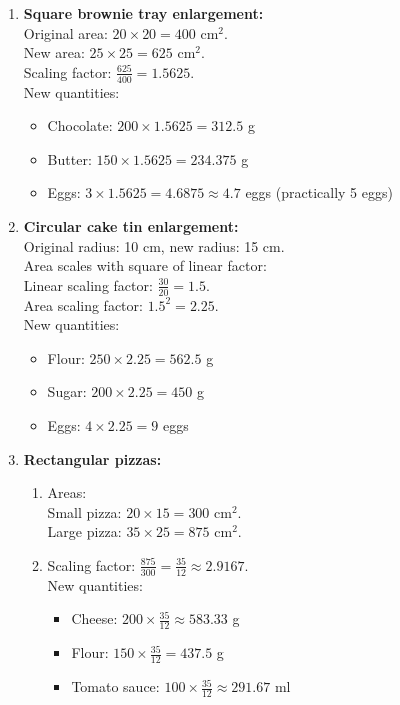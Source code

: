 \documentclass[12pt]{article}
\begin{document}
\begin{enumerate}[resume]
    \item \textbf{Square brownie tray enlargement:} \\
    Original area: \( 20 \times 20 = 400\) cm\(^2\). \\
    New area: \( 25 \times 25 = 625\) cm\(^2\). \\
    Scaling factor: \( \frac{625}{400} = 1.5625 \). \\
    New quantities:
    \begin{itemize}
        \item Chocolate: \( 200 \times 1.5625 = 312.5\) g
        \item Butter: \( 150 \times 1.5625 = 234.375\) g
        \item Eggs: \( 3 \times 1.5625 = 4.6875 \approx 4.7\) eggs (practically 5 eggs)
    \end{itemize}

    \item \textbf{Circular cake tin enlargement:} \\
    Original radius: 10 cm, new radius: 15 cm. \\
    Area scales with square of linear factor: \\
    Linear scaling factor: \( \frac{30}{20} = 1.5 \). \\
    Area scaling factor: \( 1.5^2 = 2.25 \). \\
    New quantities:
    \begin{itemize}
        \item Flour: \( 250 \times 2.25 = 562.5\) g
        \item Sugar: \( 200 \times 2.25 = 450\) g
        \item Eggs: \( 4 \times 2.25 = 9\) eggs
    \end{itemize}

    \item \textbf{Rectangular pizzas:}
    \begin{enumerate}
        \item Areas: \\
        Small pizza: \( 20 \times 15 = 300\) cm\(^2\). \\
        Large pizza: \( 35 \times 25 = 875\) cm\(^2\).
        \item Scaling factor: \( \frac{875}{300} = \frac{35}{12} \approx 2.9167\). \\
        New quantities:
        \begin{itemize}
            \item Cheese: \( 200 \times \frac{35}{12} \approx 583.33\) g
            \item Flour: \( 150 \times \frac{35}{12} = 437.5\) g
            \item Tomato sauce: \( 100 \times \frac{35}{12} \approx 291.67\) ml
        \end{itemize}
    \end{enumerate}


\end{enumerate}
\end{document}
